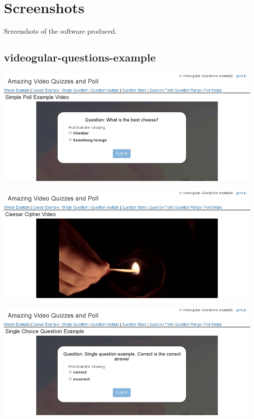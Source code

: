 \chapter{Screenshots} \label{Chapter:Screenshots}

\begin{preamble}
	Screenshots of the software produced.
\end{preamble}

\section{videogular-questions-example}

\includegraphics[width=\textwidth]{screenshots/videogular-questions-example-poll-simple.png}

\includegraphics[width=\textwidth]{screenshots/videogular-questions-example-caesar-example.png}

\includegraphics[width=\textwidth]{screenshots/videogular-questions-example-question-single.png}

